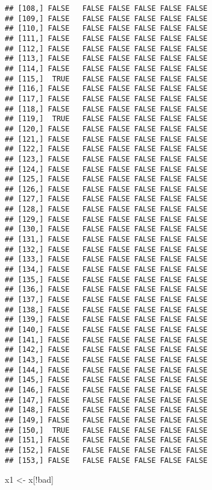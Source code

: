 \documentclass[
]{article}
\newenvironment{Shaded}{\begin{snugshade}}{\end{snugshade}}
\newcommand{\NormalTok}[1]{#1}
\newcommand{\OtherTok}[1]{\textcolor[rgb]{0.56,0.35,0.01}{#1}}
\newcommand{\SpecialCharTok}[1]{\textcolor[rgb]{0.00,0.00,0.00}{#1}}
\begin{document}
\begin{verbatim}
## [108,] FALSE   FALSE FALSE FALSE FALSE FALSE
## [109,] FALSE   FALSE FALSE FALSE FALSE FALSE
## [110,] FALSE   FALSE FALSE FALSE FALSE FALSE
## [111,] FALSE   FALSE FALSE FALSE FALSE FALSE
## [112,] FALSE   FALSE FALSE FALSE FALSE FALSE
## [113,] FALSE   FALSE FALSE FALSE FALSE FALSE
## [114,] FALSE   FALSE FALSE FALSE FALSE FALSE
## [115,]  TRUE   FALSE FALSE FALSE FALSE FALSE
## [116,] FALSE   FALSE FALSE FALSE FALSE FALSE
## [117,] FALSE   FALSE FALSE FALSE FALSE FALSE
## [118,] FALSE   FALSE FALSE FALSE FALSE FALSE
## [119,]  TRUE   FALSE FALSE FALSE FALSE FALSE
## [120,] FALSE   FALSE FALSE FALSE FALSE FALSE
## [121,] FALSE   FALSE FALSE FALSE FALSE FALSE
## [122,] FALSE   FALSE FALSE FALSE FALSE FALSE
## [123,] FALSE   FALSE FALSE FALSE FALSE FALSE
## [124,] FALSE   FALSE FALSE FALSE FALSE FALSE
## [125,] FALSE   FALSE FALSE FALSE FALSE FALSE
## [126,] FALSE   FALSE FALSE FALSE FALSE FALSE
## [127,] FALSE   FALSE FALSE FALSE FALSE FALSE
## [128,] FALSE   FALSE FALSE FALSE FALSE FALSE
## [129,] FALSE   FALSE FALSE FALSE FALSE FALSE
## [130,] FALSE   FALSE FALSE FALSE FALSE FALSE
## [131,] FALSE   FALSE FALSE FALSE FALSE FALSE
## [132,] FALSE   FALSE FALSE FALSE FALSE FALSE
## [133,] FALSE   FALSE FALSE FALSE FALSE FALSE
## [134,] FALSE   FALSE FALSE FALSE FALSE FALSE
## [135,] FALSE   FALSE FALSE FALSE FALSE FALSE
## [136,] FALSE   FALSE FALSE FALSE FALSE FALSE
## [137,] FALSE   FALSE FALSE FALSE FALSE FALSE
## [138,] FALSE   FALSE FALSE FALSE FALSE FALSE
## [139,] FALSE   FALSE FALSE FALSE FALSE FALSE
## [140,] FALSE   FALSE FALSE FALSE FALSE FALSE
## [141,] FALSE   FALSE FALSE FALSE FALSE FALSE
## [142,] FALSE   FALSE FALSE FALSE FALSE FALSE
## [143,] FALSE   FALSE FALSE FALSE FALSE FALSE
## [144,] FALSE   FALSE FALSE FALSE FALSE FALSE
## [145,] FALSE   FALSE FALSE FALSE FALSE FALSE
## [146,] FALSE   FALSE FALSE FALSE FALSE FALSE
## [147,] FALSE   FALSE FALSE FALSE FALSE FALSE
## [148,] FALSE   FALSE FALSE FALSE FALSE FALSE
## [149,] FALSE   FALSE FALSE FALSE FALSE FALSE
## [150,]  TRUE   FALSE FALSE FALSE FALSE FALSE
## [151,] FALSE   FALSE FALSE FALSE FALSE FALSE
## [152,] FALSE   FALSE FALSE FALSE FALSE FALSE
## [153,] FALSE   FALSE FALSE FALSE FALSE FALSE
\end{verbatim}

\begin{Shaded}
\begin{Highlighting}[]
\NormalTok{x1 }\OtherTok{\textless{}{-}}\NormalTok{ x[}\SpecialCharTok{!}\NormalTok{bad]}
\end{Highlighting}
\end{Shaded}
\end{document}

